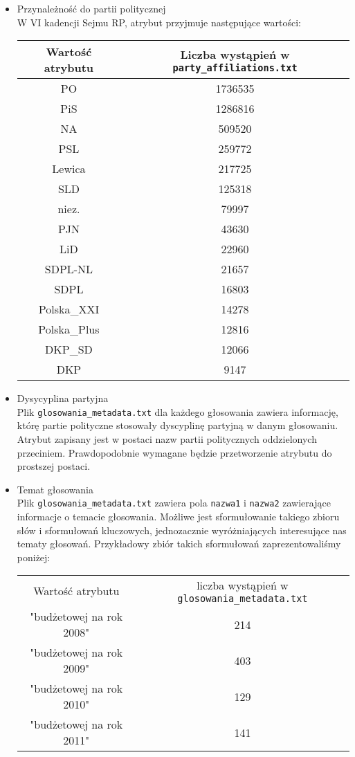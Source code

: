 \documentclass[a4 14pt]{report}
\begin{document}
			\begin{itemize}
				\item{Przynależność do partii politycznej}\\
					W VI kadencji Sejmu RP, atrybut przyjmuje następujące wartości:
					\begin{center}
					\begin{tabular}{c|c}
    						Wartość atrybutu & Liczba wystąpień w \texttt{party\_affiliations.txt} \\ \hline
						PO & 1736535 \\
						PiS & 1286816 \\
						NA & 509520 \\
						PSL &  259772 \\
						Lewica & 217725 \\
						SLD & 125318 \\
						niez. & 79997 \\
						PJN &  43630 \\
						LiD & 22960 \\
						SDPL-NL &  21657 \\
						SDPL & 16803 \\
						Polska\_XXI &  14278 \\
						Polska\_Plus &  12816 \\
						DKP\_SD & 12066 \\
						DKP & 9147 \\
 					\end{tabular}
					\end{center}				
				\item{Dysycyplina partyjna}\\
					Plik \texttt{glosowania\_metadata.txt} dla każdego głosowania zawiera informację, którę partie polityczne stosowały dyscyplinę partyjną w danym głosowaniu. Atrybut zapisany jest w postaci nazw partii politycznych oddzielonych przeciniem. Prawdopodobnie wymagane będzie przetworzenie atrybutu do prostszej postaci.
				\item{Temat głosowania}\\
					Plik \texttt{glosowania\_metadata.txt} zawiera pola \texttt{nazwa1} i \texttt{nazwa2} zawierające informacje o temacie głosowania. 
					Możliwe jest sformułowanie takiego zbioru słów i sformułowań kluczowych, jednozacznie wyróżniających interesujące nas tematy głosowań. Przykładowy zbiór takich sformułowań zaprezentowaliśmy poniżej:
					\begin{center}
					\begin{tabular}{c|c}
						Wartość atrybutu & liczba wystąpień w \texttt{glosowania\_metadata.txt} \\
						"budżetowej na rok 2008" & 214 \\
						"budżetowej na rok 2009" & 403 \\
						"budżetowej na rok 2010" & 129 \\  
						"budżetowej na rok 2011" & 141
					\end{tabular}
					\end{center}	
				

\end{itemize}
\end{document}
